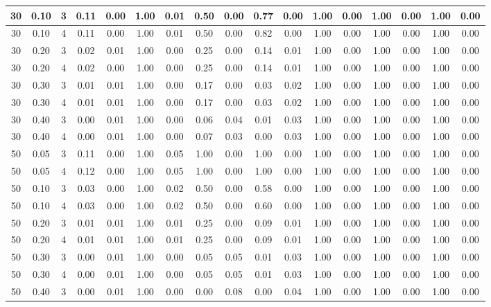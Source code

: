 \documentclass[12pt]{article}
\begin{document}
\begin{table}[H]
{\begin{tabular}{|*{17}{c|}|}
30 & 0.10 & 3 & 0.11 & 0.00 & 1.00 & 0.01 & 0.50 & 0.00 & 0.77 & 0.00 & 1.00 & 0.00 & 1.00 & 0.00 & 1.00 & 0.00 \\ \hline
30 & 0.10 & 4 & 0.11 & 0.00 & 1.00 & 0.01 & 0.50 & 0.00 & 0.82 & 0.00 & 1.00 & 0.00 & 1.00 & 0.00 & 1.00 & 0.00 \\ \hline
30 & 0.20 & 3 & 0.02 & 0.01 & 1.00 & 0.00 & 0.25 & 0.00 & 0.14 & 0.01 & 1.00 & 0.00 & 1.00 & 0.00 & 1.00 & 0.00 \\ \hline
30 & 0.20 & 4 & 0.02 & 0.00 & 1.00 & 0.00 & 0.25 & 0.00 & 0.14 & 0.01 & 1.00 & 0.00 & 1.00 & 0.00 & 1.00 & 0.00 \\ \hline
30 & 0.30 & 3 & 0.01 & 0.01 & 1.00 & 0.00 & 0.17 & 0.00 & 0.03 & 0.02 & 1.00 & 0.00 & 1.00 & 0.00 & 1.00 & 0.00 \\ \hline
30 & 0.30 & 4 & 0.01 & 0.01 & 1.00 & 0.00 & 0.17 & 0.00 & 0.03 & 0.02 & 1.00 & 0.00 & 1.00 & 0.00 & 1.00 & 0.00 \\ \hline
30 & 0.40 & 3 & 0.00 & 0.01 & 1.00 & 0.00 & 0.06 & 0.04 & 0.01 & 0.03 & 1.00 & 0.00 & 1.00 & 0.00 & 1.00 & 0.00 \\ \hline
30 & 0.40 & 4 & 0.00 & 0.01 & 1.00 & 0.00 & 0.07 & 0.03 & 0.00 & 0.03 & 1.00 & 0.00 & 1.00 & 0.00 & 1.00 & 0.00 \\ \hline
50 & 0.05 & 3 & 0.11 & 0.00 & 1.00 & 0.05 & 1.00 & 0.00 & 1.00 & 0.00 & 1.00 & 0.00 & 1.00 & 0.00 & 1.00 & 0.00 \\ \hline
50 & 0.05 & 4 & 0.12 & 0.00 & 1.00 & 0.05 & 1.00 & 0.00 & 1.00 & 0.00 & 1.00 & 0.00 & 1.00 & 0.00 & 1.00 & 0.00 \\ \hline
50 & 0.10 & 3 & 0.03 & 0.00 & 1.00 & 0.02 & 0.50 & 0.00 & 0.58 & 0.00 & 1.00 & 0.00 & 1.00 & 0.00 & 1.00 & 0.00 \\ \hline
50 & 0.10 & 4 & 0.03 & 0.00 & 1.00 & 0.02 & 0.50 & 0.00 & 0.60 & 0.00 & 1.00 & 0.00 & 1.00 & 0.00 & 1.00 & 0.00 \\ \hline
50 & 0.20 & 3 & 0.01 & 0.01 & 1.00 & 0.01 & 0.25 & 0.00 & 0.09 & 0.01 & 1.00 & 0.00 & 1.00 & 0.00 & 1.00 & 0.00 \\ \hline
50 & 0.20 & 4 & 0.01 & 0.01 & 1.00 & 0.01 & 0.25 & 0.00 & 0.09 & 0.01 & 1.00 & 0.00 & 1.00 & 0.00 & 1.00 & 0.00 \\ \hline
50 & 0.30 & 3 & 0.00 & 0.01 & 1.00 & 0.00 & 0.05 & 0.05 & 0.01 & 0.03 & 1.00 & 0.00 & 1.00 & 0.00 & 1.00 & 0.00 \\ \hline
50 & 0.30 & 4 & 0.00 & 0.01 & 1.00 & 0.00 & 0.05 & 0.05 & 0.01 & 0.03 & 1.00 & 0.00 & 1.00 & 0.00 & 1.00 & 0.00 \\ \hline
50 & 0.40 & 3 & 0.00 & 0.01 & 1.00 & 0.00 & 0.00 & 0.08 & 0.00 & 0.04 & 1.00 & 0.00 & 1.00 & 0.00 & 1.00 & 0.00 \\ \hline

\end{tabular}}
\end{table}
\end{document}
